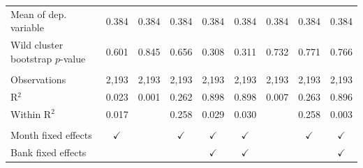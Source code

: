 \begin{table}[!h]
\begin{threeparttable}[b]
\begin{tabular}{lcccccccc}
         Mean of dep. variable            & 0.384         & 0.384         & 0.384         & 0.384         & 0.384         & 0.384         & 0.384         & 0.384\\  
         Wild cluster bootstrap $p$-value & 0.601         & 0.845         & 0.656         & 0.308         & 0.311         & 0.732         & 0.771         & 0.766\\  
          \\
         Observations                     & 2,193         & 2,193         & 2,193         & 2,193         & 2,193         & 2,193         & 2,193         & 2,193\\  
         R$^2$                            & 0.023         & 0.001         & 0.262         & 0.898         & 0.898         & 0.007         & 0.263         & 0.896\\  
         Within R$^2$                     & 0.017         &               & 0.258         & 0.029         & 0.030         &               & 0.258         & 0.003\\  
          \\
         Month fixed effects              & $\checkmark$  &               & $\checkmark$  & $\checkmark$  & $\checkmark$  &               & $\checkmark$  & $\checkmark$\\   
         Bank fixed effects               &               &               &               & $\checkmark$  & $\checkmark$  &               &               & $\checkmark$\\   
         \bottomrule
      \end{tabular}
      

\end{threeparttable}
\end{table}
